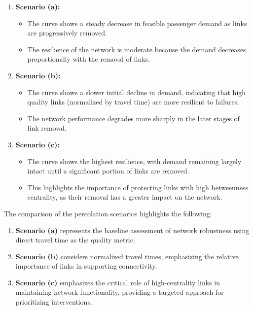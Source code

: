 \documentclass[
  letterpaper,
  DIV=11,
  numbers=noendperiod]{scrartcl}
\providecommand{\tightlist}{%
  \setlength{\itemsep}{0pt}\setlength{\parskip}{0pt}}\usepackage{longtable,booktabs,array}
\begin{document}
\begin{enumerate}
\def\labelenumi{\arabic{enumi}.}
\tightlist
\item
  \textbf{Scenario (a):}

  \begin{itemize}
  \tightlist
  \item
    The curve shows a steady decrease in feasible passenger demand as
    links are progressively removed.
  \item
    The resilience of the network is moderate because the demand
    decreases proportionally with the removal of links.
  \end{itemize}
\item
  \textbf{Scenario (b):}

  \begin{itemize}
  \tightlist
  \item
    The curve shows a slower initial decline in demand, indicating that
    high quality links (normalized by travel time) are more resilient to
    failures.
  \item
    The network performance degrades more sharply in the later stages of
    link removal.
  \end{itemize}
\item
  \textbf{Scenario (c):}

  \begin{itemize}
  \tightlist
  \item
    The curve shows the highest resilience, with demand remaining
    largely intact until a significant portion of links are removed.
  \item
    This highlights the importance of protecting links with high
    betweenness centrality, as their removal has a greater impact on the
    network.
  \end{itemize}
\end{enumerate}

The comparison of the percolation scenarios highlights the following:

\begin{enumerate}
\def\labelenumi{\arabic{enumi}.}
\tightlist
\item
  \textbf{Scenario (a)} represents the baseline assessment of network
  robustness using direct travel time as the quality metric.
\item
  \textbf{Scenario (b)} considers normalized travel times, emphasizing
  the relative importance of links in supporting connectivity.
\item
  \textbf{Scenario (c)} emphasizes the critical role of high-centrality
  links in maintaining network functionality, providing a targeted
  approach for prioritizing interventions.
\end{enumerate}
\end{document}
